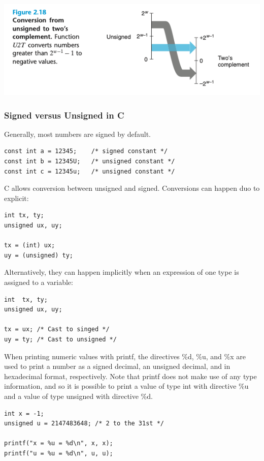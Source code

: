 \documentclass[11pt]{article}
\begin{document}
\begin{center}
\includegraphics[width=.9\linewidth]{pics/u2t-example.png}
\end{center}



\subsubsection{Signed versus Unsigned in C}
\label{sec:org0f1517b}
Generally, most numbers are signed by default.\\
\begin{verbatim}
const int a = 12345;	/* signed constant */
const int b = 12345U;	/* unsigned constant */
const int c = 12345u;	/* unsigned constant */
\end{verbatim}

C allows conversion between unsigned and signed. Conversions can happen duo to explicit:\\
\begin{verbatim}
int tx, ty;
unsigned ux, uy;

tx = (int) ux;
uy = (unsigned) ty;
\end{verbatim}

Alternatively, they can happen implicitly when an expression of one type is assigned to a variable:\\
\begin{verbatim}
int  tx, ty;
unsigned ux, uy;

tx = ux; /* Cast to singed */
uy = ty; /* Cast to unsigned */
\end{verbatim}


When printing numeric values with printf, the directives \%d, \%u, and \%x are used to print a number as a signed decimal, an unsigned decimal, and in hexadecimal format, respectively. Note that printf does not make use of any type information, and so it is possible to print a value of type int with directive \%u and a value of type unsigned with directive \%d.\\

\begin{verbatim}
int x = -1;
unsigned u = 2147483648; /* 2 to the 31st */

printf("x = %u = %d\n", x, x);
printf("u = %u = %d\n", u, u);
\end{verbatim}
\end{document}
